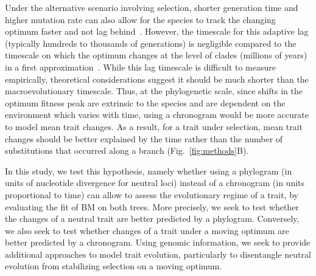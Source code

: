 \documentclass{article}
\begin{document}
Under the alternative scenario involving selection, shorter generation time and higher mutation rate can also allow for the species to track the changing optimum faster and not lag behind~\citep{lande_natural_1976, hansen_comparative_2008}.
However, the timescale for this adaptive lag (typically hundreds to thousands of generations) is negligible compared to the timescale on which the optimum changes at the level of clades (millions of years) in a first approximation~\citep{hansen_three_2024}.
While this lag timescale is difficult to measure empirically, theoretical considerations suggest it should be much shorter than the macroevolutionary timescale.
Thus, at the phylogenetic scale, since shifts in the optimum fitness peak are extrinsic to the species and are dependent on the environment which varies with time, using a chronogram would be more accurate to model mean trait changes.
As a result, for a trait under selection, mean trait changes should be better explained by the time rather than the number of substitutions that occurred along a branch (Fig.~\ref{fig:methods}B).

In this study, we test this hypothesis, namely whether using a phylogram (in units of nucleotide divergence for neutral loci) instead of a chronogram (in units proportional to time) can allow to assess the evolutionary regime of a trait, by evaluating the fit of BM on both trees.
More precisely, we seek to test whether the changes of a neutral trait are better predicted by a phylogram.
Conversely, we also seek to test whether changes of a trait under a moving optimum are better predicted by a chronogram.
Using genomic information, we seek to provide additional approaches to model trait evolution, particularly to disentangle neutral evolution from stabilizing selection on a moving optimum.
\end{document}
